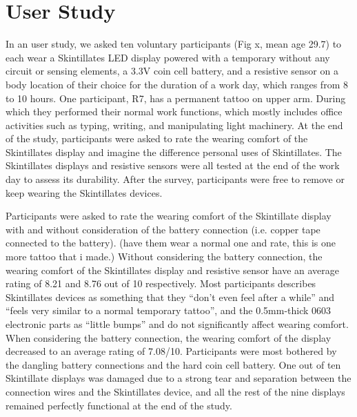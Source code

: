 \documentclass{sigchi}
\begin{document}
\section {User Study}
In an user study, we asked ten voluntary participants (Fig x, mean age 29.7) to each wear a Skintillates LED display powered with a temporary without any circuit or sensing elements, a 3.3V coin cell battery, and a resistive sensor on a body location of their choice for the duration of a work day, which ranges from 8 to 10 hours. One participant, R7, has a permanent tattoo on upper arm. During which they performed their normal work functions, which mostly includes office activities such as typing, writing, and manipulating light machinery. At the end of the study, participants were asked to rate the wearing comfort of the Skintillates display and imagine the difference personal uses of Skintillates. The Skintillates displays and resistive sensors were all tested at the end of the work day to assess its durability. After the survey, participants were free to remove or keep wearing the Skintillates devices. 

Participants were asked to rate the wearing comfort of the Skintillate display with and without consideration of the battery connection (i.e. copper tape connected to the battery). (have them wear a normal one and rate, this is one more tattoo that i made.) Without considering the battery connection, the wearing comfort of the Skintillates display and resistive sensor have an average rating of 8.21 and 8.76 out of 10 respectively. Most participants describes Skintillates devices as something that they ``don't even feel after a while'' and ``feels very similar to a normal temporary tattoo'', and the 0.5mm-thick 0603 electronic parts as ``little bumps'' and do not significantly affect wearing comfort. When considering the battery connection, the wearing comfort of the display decreased to an average rating of 7.08/10. Participants were most bothered by the dangling battery connections and the hard coin cell battery. One out of ten Skintillate displays was damaged due to a strong tear and separation between the connection wires and the Skintillates device, and all the rest of the nine displays remained perfectly functional at the end of the study.
\end{document}
